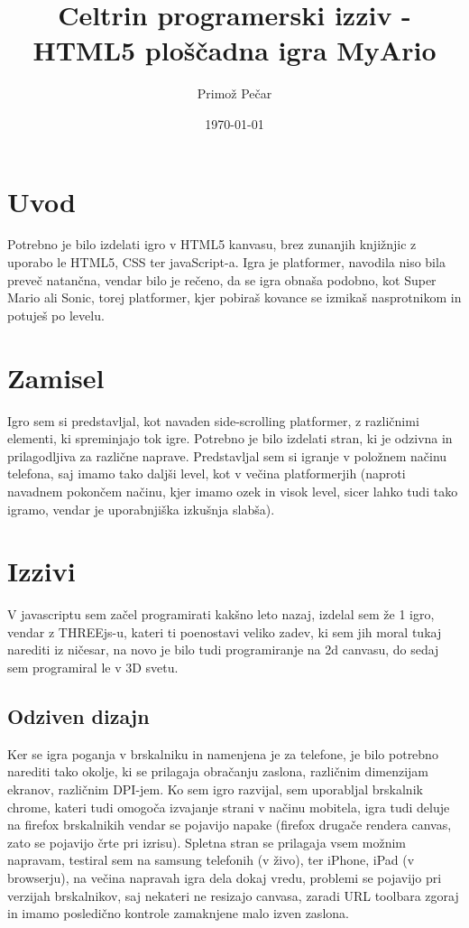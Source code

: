 \documentclass[a4paper,11pt]{article}
\title{Celtrin programerski izziv - HTML5 ploščadna igra MyArio}
\author{Primož Pečar }
\date{\today}
\begin{document}
\maketitle

\section{Uvod}

Potrebno je bilo izdelati igro v HTML5 kanvasu, brez zunanjih knjižnjic z uporabo le HTML5, CSS ter javaScript-a. Igra je platformer, navodila niso bila preveč natančna, vendar bilo je rečeno, da se igra obnaša podobno, kot Super Mario ali Sonic, torej platformer, kjer pobiraš kovance se izmikaš nasprotnikom in potuješ po levelu. 

\section{Zamisel}

Igro sem si predstavljal, kot navaden side-scrolling platformer, z različnimi elementi, ki spreminjajo tok igre. Potrebno je bilo izdelati stran, ki je odzivna in prilagodljiva za različne naprave. Predstavljal sem si igranje v položnem načinu telefona, saj imamo tako daljši level, kot v večina platformerjih (naproti navadnem pokončem načinu, kjer imamo ozek in visok level, sicer lahko tudi tako igramo, vendar je uporabnjiška izkušnja slabša).

\section{Izzivi}

V javascriptu sem začel programirati kakšno leto nazaj, izdelal sem že 1 igro, vendar z THREEjs-u, kateri ti poenostavi veliko zadev, ki sem jih moral tukaj narediti iz ničesar, na novo je bilo tudi programiranje na 2d canvasu, do sedaj sem programiral le v 3D svetu. 

\subsection{Odziven dizajn}

Ker se igra poganja v brskalniku in namenjena je za telefone, je bilo potrebno narediti tako okolje, ki se prilagaja obračanju zaslona, različnim dimenzijam ekranov, različnim DPI-jem. Ko sem igro razvijal, sem uporabljal brskalnik chrome, kateri tudi omogoča izvajanje strani v načinu mobitela, igra tudi deluje na firefox brskalnikih vendar se pojavijo napake (firefox drugače rendera canvas, zato se pojavijo črte pri izrisu). Spletna stran se prilagaja vsem možnim napravam, testiral sem na samsung telefonih (v živo), ter iPhone, iPad (v browserju), na večina napravah igra dela dokaj vredu, problemi se pojavijo pri verzijah brskalnikov, saj nekateri ne resizajo canvasa, zaradi URL toolbara zgoraj in imamo posledično kontrole zamaknjene malo izven zaslona.
\end{document}
